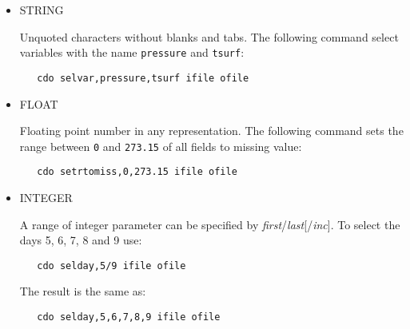 \begin{itemize}
\item STRING

Unquoted characters without blanks and tabs.
The following command select variables with the name {\tt pressure} and {\tt tsurf}:
\begin{verbatim}
   cdo selvar,pressure,tsurf ifile ofile
\end{verbatim}

\item FLOAT

Floating point number in any representation.
The following command sets the range between {\tt 0} and {\tt 273.15}
of all fields to missing value:
\begin{verbatim}
   cdo setrtomiss,0,273.15 ifile ofile
\end{verbatim}

\item INTEGER

A range of integer parameter can be specified by {\it first}/{\it last}[/{\it inc}].
To select the days 5, 6, 7, 8 and 9 use:
\begin{verbatim}
   cdo selday,5/9 ifile ofile
\end{verbatim}
The result is the same as:
\begin{verbatim}
   cdo selday,5,6,7,8,9 ifile ofile
\end{verbatim}
\end{itemize}
